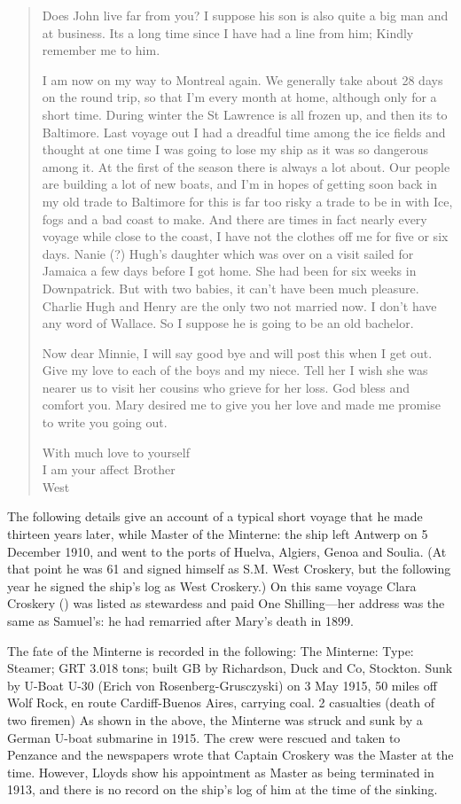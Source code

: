 \begin{quotation}
Does John live far from you? I suppose his son is also quite a big man and at business. Its a long time since I have had a line from him; Kindly remember me to him.

I am now on my way to Montreal again. We generally take about 28 days on the round trip, so that I'm every month at home, although only for a short time. During winter the St Lawrence is all frozen up, and then its to Baltimore. Last voyage out I had a dreadful time among the ice fields and thought at one time I was going to lose my ship as it was so dangerous among it. At the first of the season there is always a lot about. Our people are building a lot of new boats, and I'm in hopes of getting soon back in my old trade to Baltimore for this is far too risky a trade to be in with Ice, fogs and a bad coast to make. And there are times in fact nearly every voyage while close to the coast, I have not the clothes off me for five or six days. Nanie (?) Hugh's daughter which was over on a visit sailed for Jamaica a few days before I got home. She had been for six weeks in Downpatrick. But with two babies, it can't have been much pleasure. Charlie Hugh and Henry are the only two not married now. I don't have any word of Wallace. So I suppose he is going to be an old bachelor.

Now dear Minnie, I will say good bye and will post this when I get out. Give my love to each of the boys and my niece. Tell her I wish she was nearer us to visit her cousins who grieve for her loss. God bless and comfort you. Mary desired me to give you her love and made me promise to write you going out.

With much love to yourself \\
I am your affect Brother \\
West 
\end{quotation}

The following details give an account of a typical short voyage that he made thirteen years later, while Master of the Minterne: the ship left Antwerp on 5 December 1910, and went to the ports of Huelva, Algiers, Genoa and Soulia. (At that point he was 61 and signed himself as S.M. West Croskery, but the following year he signed the ship's log as West Croskery.) On this same voyage Clara Croskery () was listed as stewardess and paid One Shilling---her address was the same as Samuel's: he had remarried after Mary's death in 1899.

The fate of the Minterne is recorded in the following: 
The Minterne: Type: Steamer; GRT 3.018 tons; built GB by Richardson, Duck and Co, Stockton. Sunk by U-Boat U-30 (Erich von Rosenberg-Grusczyski) on 3 May 1915, 50 miles off Wolf Rock, en route Cardiff-Buenos Aires, carrying coal. 2 casualties (death of two firemen) \cite{www.uboat.net/ww1/ships} As shown in the above, the Minterne was struck and sunk by a German U-boat submarine in 1915.  The crew were rescued and taken to Penzance and the newspapers wrote that Captain Croskery was the Master at the time. However, Lloyds show his appointment as Master as being terminated in 1913, and there is no record on the ship's log of him at the time of the sinking.


